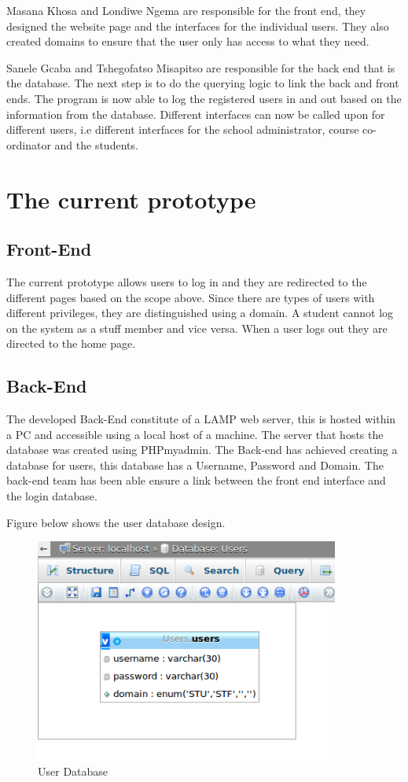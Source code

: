 \documentclass[10pt,onecolumn]{lab}
\begin{document}
Masana Khosa and Londiwe Ngema are responsible for the front end, they designed the website page and the interfaces for the individual users. They also created domains to ensure that the user only has access to what they need.

Sanele Gcaba and Tshegofatso Misapitso are responsible for the back end that is the database. The next step is to do the querying logic to link the back and front ends. The program is now able to log the registered users in and out based on the information from the database. Different interfaces can now be called upon for different users, i.e different interfaces for the school administrator, course co-ordinator and the students.

\section{The current prototype}

\subsection{Front-End}
The current prototype allows users to log in and they are redirected to the different pages based on the scope above. Since there are types of users with different privileges, they are distinguished using a domain. A student cannot log on the system as a stuff member and vice versa. When a user logs out they are directed to the home page.

\subsection{Back-End}
The developed Back-End constitute of a LAMP web server, this is hosted within a PC and accessible using a local host of a machine. The server that hosts the database was created using PHPmyadmin. The Back-end has achieved creating a database for users, this database has a Username, Password and Domain. The back-end team has been able ensure a link between the front end interface and the login database. 

Figure below shows the user database design.

\begin{center}
\begin{figure}[h]
\centering
\includegraphics[width=10cm]{Users}
\caption{User Database}
\end{figure}
\end{center}
     
\end{document}
